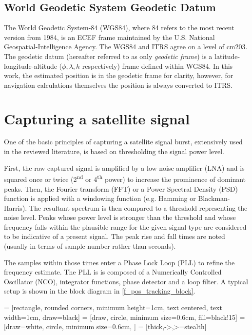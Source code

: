 \subsection{World Geodetic System Geodetic Datum}
The World Geodetic System-84 (WGS84), where 84 refers to the most recent version from 1984, is an ECEF frame maintained by the U.S. National Geospatial-Intelligence Agency. The WGS84 and ITRS agree on a level of \unit{cm}\citep{pos01}{203}. The geodetic datum  (hereafter referred to as only \textit{geodetic frame}) is a latitude-longitude-altitude ($\phi, \lambda, h$ respectively) frame defined within WGS84. In this work, the estimated position is in the geodetic frame for clarity, however, for navigation calculations themselves the position is always converted to ITRS.

\section{Capturing a satellite signal}
\label{s_pos_tracking_satellite}
One of the basic principles of capturing a satellite signal burst, extensively used in the reviewed literature, is based on thresholding the signal power level.

First, the raw captured signal is amplified by a low noise amplifier (LNA) and is squared once or twice (2\textsuperscript{nd} or 4\textsuperscript{th} power) to increase the prominence of dominant peaks. Then, the Fourier transform (FFT) or a Power Spectral Density (PSD) function is applied with a windowing function (e.g. Hamming or Blackman-Harris). The resultant spectrum is then compared to a threshold representing the noise level. Peaks whose power level is stronger than the threshold and whose frequency falls within the plausible range for the given signal type are considered to be indicative of a present signal. The peak rise and fall times are noted (usually in terms of sample number rather than seconds). 

The samples within those times enter a Phase Lock Loop (PLL) to refine the frequency estimate. The PLL is is composed of a Numerically Controlled Oscillator
(NCO), integrator functions, phase detector and a loop filter. A typical setup is shown in the block diagram in \autoref{f_pos_tracking_block}\cite{sop03, sop04, sop05}.

 = [rectangle, rounded corners, minimum height=1cm, text centered, text width=1cm, draw=black]
 = [draw, circle, minimum size=0.6cm, fill=black!15]
 = [draw=white, circle, minimum size=0.6cm, ]
 = [thick,->,>=stealth]


